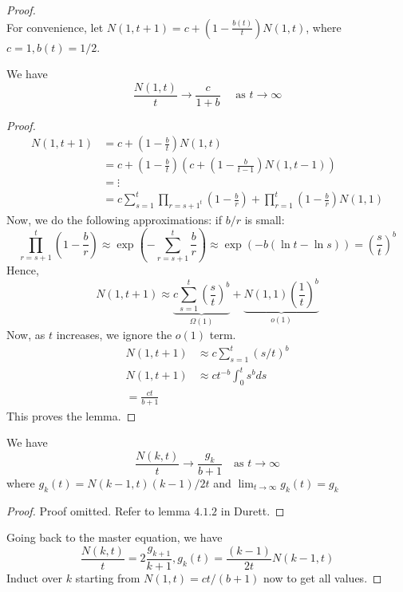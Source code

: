 \begin{proof}
\[\]
For convenience, let $N(1,t+1) = c + \left(1 - \frac{b(t)}{t}\right) N(1,t)$, where $c = 1, b(t) = 1/2$.
\begin{lemma}
We have
\[
\frac{N(1,t)}{t} \longrightarrow \frac{c}{1+b} \quad \text{ as $t\to\infty$}
\]
\end{lemma}
\begin{proof}
\begin{align*}
    N(1,t+1) &= c + \left(1 - \frac{b}{t}\right)N(1,t) \\
    &= c + \left(1 - \frac{b}{t}\right)\left(c + \left(1 - \frac{b}{t-1}\right)N(1,t-1)\right) \\
    &= \vdots \\
    &= c\sum_{s=1}^t \prod_{r=s+1^t}\left(1-\frac{b}{r}\right) + \prod_{r=1}^t \left(1-\frac{b}{r}\right) N(1,1)
\end{align*}
Now, we do the following approximations: if $b/r$ is small:
\[
\prod_{r=s+1}^t \left(1 - \frac br\right) \approx \exp\left(-\sum_{r=s+1}^t \frac br\right) \approx \exp(-b(\ln t - \ln s)) = \left(\frac st\right)^b
\]
Hence,
\[
N(1, t+1) \approx \underbrace{c\sum_{s=1}^t \left(\frac{s}{t}\right)^b}_{\Omega(1)} + \underbrace{N(1,1) \left(\frac{1}{t}\right)^b}_{o(1)}
\]
Now, as $t$ increases, we ignore the $o(1)$ term.
\begin{align*}
    N(1,t+1) &\approx c\sum_{s=1}^t (s/t)^b \\
    N(1,t+1) &\approx c t^{-b} \int_0^t s^b ds \\
    = \frac{ct}{b+1}
\end{align*}
This proves the lemma.
\end{proof}
\begin{lemma}
We have
\[
\frac{N(k,t)}{t} \longrightarrow \frac{g_k}{b+1} \quad \text{as } t \to \infty
\]
where $g_k(t) = N(k-1,t)(k-1)/2t$ and $\lim_{t\to\infty} g_k(t) = g_k$
\end{lemma}
\begin{proof}
Proof omitted. Refer to lemma $4.1.2$ in Durett.
\end{proof}
Going back to the master equation, we have
\[
\frac{N(k,t)}{t} = 2\frac{g_{k+1}}{k+1}, g_k(t) = \frac{(k-1)}{2t}N(k-1,t)
\]
Induct over $k$ starting from $N(1,t) = ct/(b+1)$ now to get all values.
\end{proof}